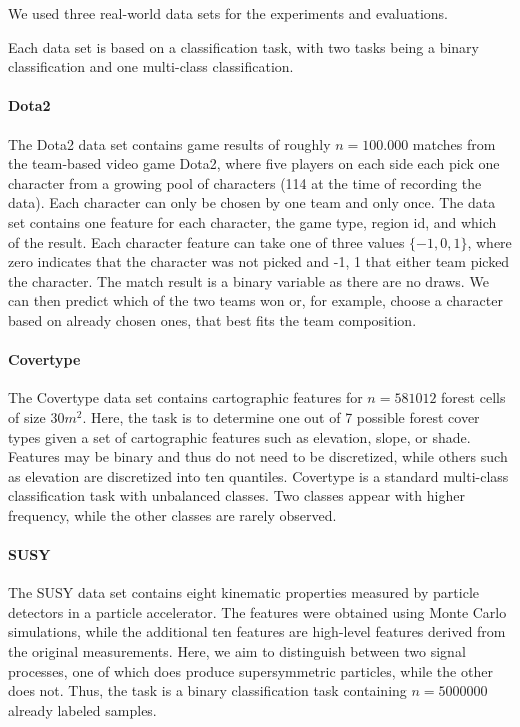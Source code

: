 We used three real-world data sets for the experiments and evaluations. 

Each data set is based on a classification task, with two tasks being a binary classification and one multi-class classification.

\paragraph*{Dota2}
The Dota2 data set contains game results of roughly $n=100.000$ matches from the team-based video game Dota2, where five players on each side each pick one character from a growing pool of characters (114 at the time of recording the data).
Each character can only be chosen by one team and only once.
The data set contains one feature for each character, the game type, region id, and which of the result.
Each character feature can take one of three values $\{-1,0,1\}$, where zero indicates that the character was not picked and -1, 1 that either team picked the character.
The match result is a binary variable as there are no draws.
We can then predict which of the two teams won or, for example, choose a character based on already chosen ones, that best fits the team composition.

\paragraph*{Covertype}
The Covertype data set contains cartographic features for  $n=581012$ forest cells of size $30m^2$.
Here, the task is to determine one out of 7 possible forest cover types given a set of cartographic features such as elevation, slope, or shade. 
Features may be binary and thus do not need to be discretized, while others such as elevation are discretized into ten quantiles.
Covertype is a standard multi-class classification task with unbalanced classes.
Two classes appear with higher frequency, while the other classes are rarely observed.

\paragraph*{SUSY}
The SUSY data set contains eight kinematic properties measured by particle detectors in a particle accelerator. 
The features were obtained using Monte Carlo simulations, while the additional ten features are high-level features derived from the original measurements.
Here, we aim to distinguish between two signal processes, one of which does produce supersymmetric particles, while the other does not. 
Thus, the task is a binary classification task containing $n=5000000$ already labeled samples.

